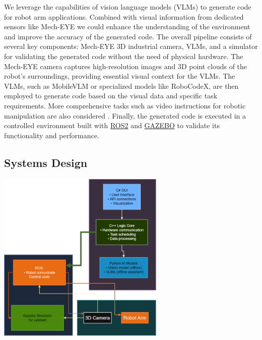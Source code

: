 \documentclass[conference]{IEEEtran}
\begin{document}
We leverage the capabilities of vision language models (VLMs) to generate code for robot arm applications. Combined with visual information from dedicated sensors like Mech-EYE we could enhance the understanding of the environment and improve the accuracy of the generated code. 
The overall pipeline consists of several key components: Mech-EYE 3D industrial camera, VLMs, and a simulator for validating the generated code without the need of physical hardware. The Mech-EYE camera captures high-resolution images and 3D point clouds of the robot's surroundings, providing essential visual context for the VLMs. The VLMs, such as MobileVLM or specialized models like RoboCodeX\cite{mu2024robocodex}, are then employed to generate code based on the visual data and specific task requirements. More comprehensive tasks such as video instructions for robotic manipulation are also considered \cite{xie2025robotic}.
Finally, the generated code is executed in a controlled environment built with \href{https://docs.ros.org/}{ROS2} and \href{http://gazebosim.org/}{GAZEBO} to validate its functionality and performance.
\subsection{Systems Design}
\includegraphics[width=8cm]{Design.png}
\end{document}
